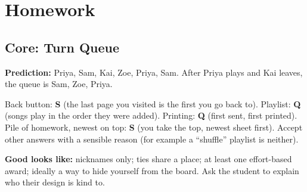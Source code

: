 \section{Homework}
\subsection{Core: Turn Queue}
\begin{answer}
\textbf{Prediction:} Priya, Sam, Kai, Zoe, Priya, Sam. After Priya plays and Kai leaves, the queue is Sam, Zoe, Priya.
\end{answer}

\begin{answer}
Back button: \textbf{S} (the last page you visited is the first you go back to). Playlist: \textbf{Q} (songs play in the order they were added). Printing: \textbf{Q} (first sent, first printed). Pile of homework, newest on top: \textbf{S} (you take the top, newest sheet first).
Accept other answers with a sensible reason (for example a \enquote{shuffle} playlist is neither).
\end{answer}

\begin{answer}
\textbf{Good looks like:} nicknames only; ties share a place; at least one effort-based award; ideally a way to hide yourself from the board. Ask the student to explain who their design is kind to.
\end{answer}

